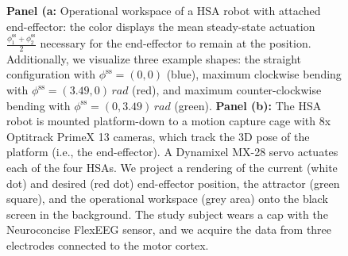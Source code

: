 \begin{figure}
\begin{center}
    \caption{\textbf{Panel (a:} Operational workspace of a HSA robot with attached end-effector: the color displays the mean steady-state actuation $\frac{\phi_1^\mathrm{ss} + \phi_2^\mathrm{ss}}{2}$ necessary for the end-effector to remain at the position. Additionally, we visualize three example shapes: the straight configuration with $\phi^\mathrm{ss} = (0, 0)$ (blue), maximum clockwise bending with $\phi^\mathrm{ss} = (3.49, 0) \, \si{rad}$ (red), and maximum counter-clockwise bending with $\phi^\mathrm{ss} = (0, 3.49) \, \si{rad}$ (green).
    \textbf{Panel (b):} The HSA robot is mounted platform-down to a motion capture cage with 8x Optitrack PrimeX 13 cameras, which track the 3D pose of the platform (i.e., the end-effector). A Dynamixel MX-28 servo actuates each of the four HSAs. We project a rendering of the current (white dot) and desired (red dot) end-effector position, the attractor (green square), and the operational workspace (grey area) onto the black screen in the background. The study subject wears a cap with the Neuroconcise FlexEEG sensor, and we acquire the data from three electrodes connected to the motor cortex.}
\end{center}
\end{figure}

